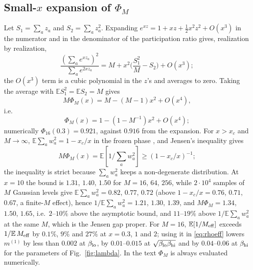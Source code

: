 \documentclass{SciPost}
\theoremstyle{plain}
\theoremstyle{definition}
\newcommand{\E}{\mathbb{E}}
\newcommand{\Meff}{M_{\rm eff}}
\begin{document}
\begin{appendix}
\section{Small-\texorpdfstring{$x$}{x} expansion of \texorpdfstring{$\Phi_M$}{Phi\_M}}
Let $S_1=\sum_az_a$ and $S_2=\sum_az_a^2$. Expanding $e^{xz}=1+xz+\frac12x^2z^2+O(x^3)$ in the numerator and in the denominator of the participation ratio gives, realization by realization,
\begin{equation*}
\frac{(\sum_ae^{xz_a})^2}{\sum_ae^{2xz_a}}=M+x^2\Big(\frac{S_1^2}{M}-S_2\Big)+O(x^3);
\end{equation*}
the $O(x^3)$ term is a cubic polynomial in the $z$'s and averages to zero. Taking the average with $\E S_1^2=\E S_2=M$ gives
\begin{equation*}
M\Phi_M(x)=M-(M-1)x^2+O(x^4),
\end{equation*}
i.e.\
\begin{equation*}
\Phi_M(x)=1-(1-M^{-1})x^2+O(x^4);
\end{equation*}
numerically $\Phi_{16}(0.3)=0.921$, against $0.916$ from the expansion. For $x>x_c$ and $M\to\infty$, $\E\sum_aw_a^2=1-x_c/x$ in the frozen phase \cite{Derrida1985b,MPV1985}, and Jensen's inequality gives
\begin{equation*}
M\Phi_M(x)=\E[1/\sum_aw_a^2]\ge(1-x_c/x)^{-1};
\end{equation*}
the inequality is strict because $\sum_aw_a^2$ keeps a non-degenerate distribution. At $x=10$ the bound is $1.31$, $1.40$, $1.50$ for $M=16$, $64$, $256$, while $2\cdot10^4$ samples of $M$ Gaussian levels give $\E\sum_aw_a^2=0.82$, $0.77$, $0.72$ (above $1-x_c/x=0.76$, $0.71$, $0.67$, a finite-$M$ effect), hence $1/\E\sum_aw_a^2=1.21$, $1.30$, $1.39$, and $M\Phi_M=1.34$, $1.50$, $1.65$, i.e.\ $2$--$10\%$ above the asymptotic bound, and $11$--$19\%$ above $1/\E\sum_aw_a^2$ at the same $M$, which is the Jensen gap proper. For $M=16$, $\E[1/\Meff]$ exceeds $1/\E\,\Meff$ by $0.1\%$, $9\%$ and $27\%$ at $x=0.3$, $1$ and $2$; using it in \eqref{eq:rhoeff} lowers $m^{(1)}$ by less than $0.002$ at $\beta_{\rm lo}$, by $0.01$--$0.015$ at $\sqrt{\beta_{\rm lo}\beta_{\rm hi}}$ and by $0.04$--$0.06$ at $\beta_{\rm hi}$ for the parameters of Fig.\ \ref{fig:lambda}. In the text $\Phi_M$ is always evaluated numerically.


\end{appendix}
\end{document}
